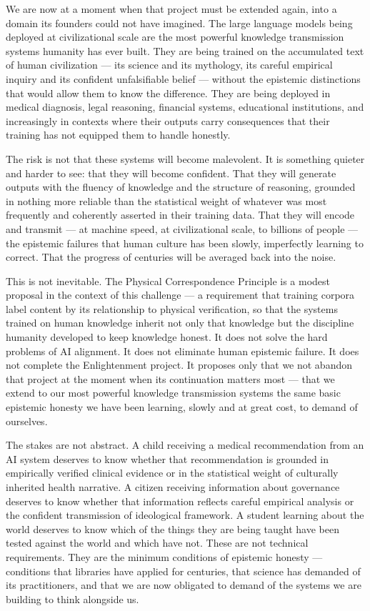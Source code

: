 \documentclass[
]{article}
\begin{document}
We are now at a moment when that project must be extended again, into a
domain its founders could not have imagined. The large language models
being deployed at civilizational scale are the most powerful knowledge
transmission systems humanity has ever built. They are being trained on
the accumulated text of human civilization --- its science and its
mythology, its careful empirical inquiry and its confident unfalsifiable
belief --- without the epistemic distinctions that would allow them to
know the difference. They are being deployed in medical diagnosis, legal
reasoning, financial systems, educational institutions, and increasingly
in contexts where their outputs carry consequences that their training
has not equipped them to handle honestly.

The risk is not that these systems will become malevolent. It is
something quieter and harder to see: that they will become confident.
That they will generate outputs with the fluency of knowledge and the
structure of reasoning, grounded in nothing more reliable than the
statistical weight of whatever was most frequently and coherently
asserted in their training data. That they will encode and transmit ---
at machine speed, at civilizational scale, to billions of people --- the
epistemic failures that human culture has been slowly, imperfectly
learning to correct. That the progress of centuries will be averaged
back into the noise.

This is not inevitable. The Physical Correspondence Principle is a
modest proposal in the context of this challenge --- a requirement that
training corpora label content by its relationship to physical
verification, so that the systems trained on human knowledge inherit not
only that knowledge but the discipline humanity developed to keep
knowledge honest. It does not solve the hard problems of AI alignment.
It does not eliminate human epistemic failure. It does not complete the
Enlightenment project. It proposes only that we not abandon that project
at the moment when its continuation matters most --- that we extend to
our most powerful knowledge transmission systems the same basic
epistemic honesty we have been learning, slowly and at great cost, to
demand of ourselves.

The stakes are not abstract. A child receiving a medical recommendation
from an AI system deserves to know whether that recommendation is
grounded in empirically verified clinical evidence or in the statistical
weight of culturally inherited health narrative. A citizen receiving
information about governance deserves to know whether that information
reflects careful empirical analysis or the confident transmission of
ideological framework. A student learning about the world deserves to
know which of the things they are being taught have been tested against
the world and which have not. These are not technical requirements. They
are the minimum conditions of epistemic honesty --- conditions that
libraries have applied for centuries, that science has demanded of its
practitioners, and that we are now obligated to demand of the systems we
are building to think alongside us.
\end{document}
